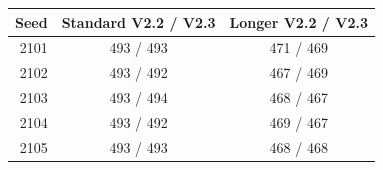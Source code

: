 \par\noindent\begin{minipage}{\columnwidth}
\label{tab:v23seeds}\centering\footnotesize
\begin{tabular}{rcc}\toprule Seed & Standard V2.2 / V2.3 & Longer V2.2 / V2.3\\\midrule
2101 & 493 / 493 & 471 / 469\\
2102 & 493 / 492 & 467 / 469\\
2103 & 493 / 494 & 468 / 467\\
2104 & 493 / 492 & 469 / 467\\
2105 & 493 / 493 & 468 / 468\\
\bottomrule\end{tabular}
\end{minipage}\par\medskip
